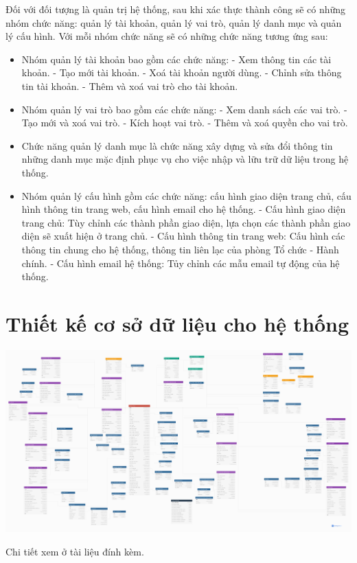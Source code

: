 \indent Đối với đối tượng là quản trị hệ thống, sau khi xác thực thành công sẽ có những nhóm chức năng: quản lý tài khoản, quản lý vai trò, quản lý danh mục và quản lý cấu hình. Với mỗi nhóm chức năng sẽ có những chức năng tương ứng sau:

\begin{itemize}
    \item Nhóm quản lý tài khoản bao gồm các chức năng:
        \subitem - Xem thông tin các tài khoản.
        \subitem - Tạo mới tài khoản.
        \subitem - Xoá tài khoản người dùng.
        \subitem - Chỉnh sửa thông tin tài khoản.
        \subitem - Thêm và xoá vai trò cho tài khoản.
    \item Nhóm quản lý vai trò bao gồm các chức năng:
        \subitem - Xem danh sách các vai trò.
        \subitem - Tạo mới và xoá vai trò.
        \subitem - Kích hoạt vai trò.
        \subitem - Thêm và xoá quyền cho vai trò.
    \item Chức năng quản lý danh mục là chức năng xây dựng và sửa đổi thông tin những danh mục mặc định phục vụ cho việc nhập và lữu trữ dữ liệu trong hệ thống.
    \item Nhóm quản lý cấu hình gồm các chức năng: cấu hình giao diện trang chủ, cấu hình thông tin trang web, cấu hình email cho hệ thống.
        \subitem - Cấu hình giao diện trang chủ: Tùy chỉnh các thành phần giao diện, lựa chọn các thành phần giao diện sẽ xuất hiện ở trang chủ.
        \subitem - Cấu hình thông tin trang web: Cấu hình các thông tin chung cho hệ thống, thông tin liên lạc của phòng Tổ chức - Hành chính.
        \subitem - Cấu hình email hệ thống: Tủy chỉnh các mẫu email tự động của hệ thống.
\end{itemize}

\section{Thiết kế cơ sở dữ liệu cho hệ thống}
\begin{center}
  \captionsetup{type=figure}
  \includegraphics[width=15cm]{img/Screen/dbdiagram.png}
\end{center}
Chi tiết xem ở tài liệu đính kèm.